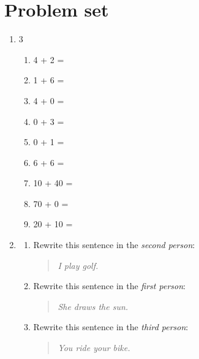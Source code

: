 \documentclass{tufte-book}
\begin{document}
\clearpage\section{Problem set }

\begin{enumerate}
  \item
  \begin{multicols}{3}
    \begin{enumerate}\bigskip
      \item 4 + 2 = \dotfill\bigskip
      \item 1 + 6 = \dotfill\bigskip
      \item 4 + 0 = \dotfill
      \item 0 + 3 = \dotfill\bigskip
      \item 0 + 1 = \dotfill\bigskip
      \item 6 + 6 = \dotfill
      \item 10 + 40 = \dotfill\bigskip
      \item 70 + 0 = \dotfill\bigskip
      \item 20 + 10 = \dotfill
    \end{enumerate}
  \end{multicols}

  \item
  \begin{enumerate}
    \item Rewrite this sentence in the \textit{second person}:
    \begin{quote}
      \textit{I play golf.}
    \end{quote}\bigskip
    \dotfill
    \item Rewrite this sentence in the \textit{first person}:
    \begin{quote}
      \textit{She draws the sun.}
    \end{quote}\bigskip
    \dotfill
    \item Rewrite this sentence in the \textit{third person}:
    \begin{quote}
      \textit{You ride your bike.}
    \end{quote}\bigskip
    \dotfill
  \end{enumerate}


\end{enumerate}
\end{document}
